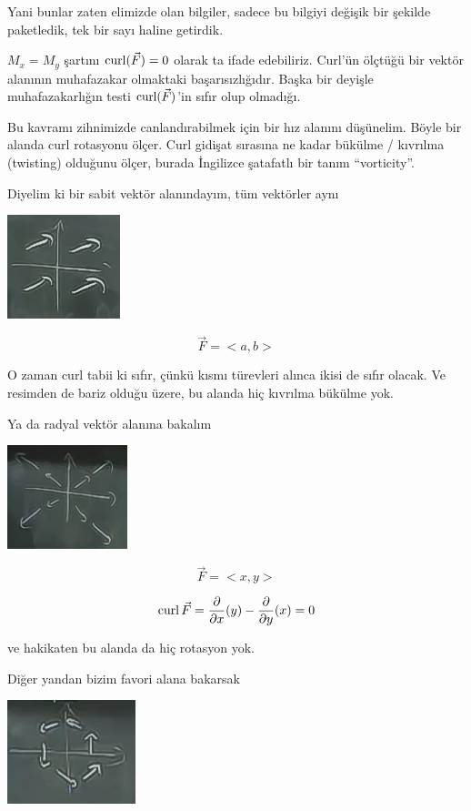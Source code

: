 \documentclass[12pt,fleqn]{article}\usepackage{../../common}
\begin{document}
Yani bunlar zaten elimizde olan bilgiler, sadece bu bilgiyi değişik bir şekilde
paketledik, tek bir sayı haline getirdik.

$M_x = M_y$ şartını $\operatorname{curl}(\vec{F}) = 0$ olarak ta ifade edebiliriz. Curl'ün
ölçtüğü bir vektör alanının muhafazakar olmaktaki başarısızlığıdır. Başka bir
deyişle muhafazakarlığın testi $\operatorname{curl}(\vec{F})$'in sıfır olup olmadığı.


Bu kavramı zihnimizde canlandırabilmek için bir hız alanını düşünelim. Böyle bir
alanda curl rotasyonu ölçer. Curl gidişat sırasına ne kadar bükülme / kıvrılma
(twisting) olduğunu ölçer, burada İngilizce şatafatlı bir tanım ``vorticity''.


Diyelim ki bir sabit vektör alanındayım, tüm vektörler aynı
\begin{center}
\includegraphics[height=3cm]{21_5.png}
\end{center}
$$ \vec{F} = <a,b> $$

O zaman curl tabii ki sıfır, çünkü kısmı türevleri alınca ikisi de sıfır
olacak. Ve resimden de bariz olduğu üzere, bu alanda hiç kıvrılma bükülme yok.

Ya da radyal vektör alanına bakalım
\begin{center}
\includegraphics[height=3cm]{21_6.png}
\end{center}
$$ \vec{F}= <x,y> $$

$$
\operatorname{curl} \vec{F} =
\frac{\partial }{\partial x}(y) -
\frac{\partial }{\partial y}(x) = 0
$$

ve hakikaten bu alanda da hiç rotasyon yok. 

Diğer yandan bizim favori alana bakarsak
\begin{center}
\includegraphics[height=3cm]{21_1.png}
\end{center}
\end{document}
